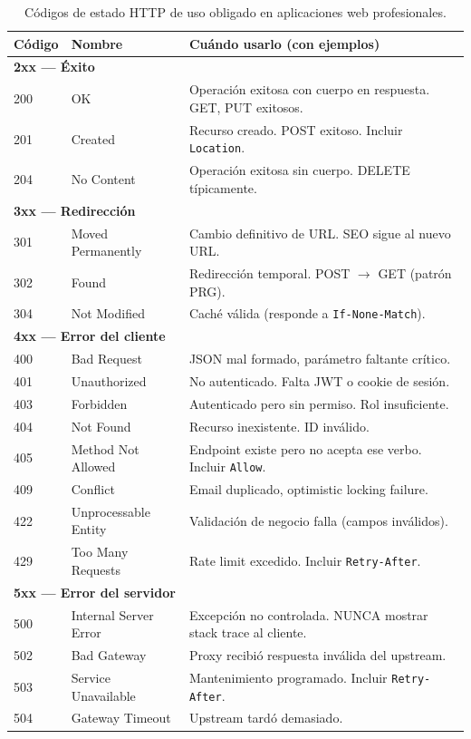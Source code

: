 \documentclass[11pt,a4paper,openany]{book}
\begin{document}
\begin{table}[htbp]
\centering
\caption{Códigos de estado HTTP de uso obligado en aplicaciones web profesionales.}
\footnotesize
\begin{tabularx}{\textwidth}{llX}
\toprule
\textbf{Código} & \textbf{Nombre} & \textbf{Cuándo usarlo (con ejemplos)}\\
\midrule
\multicolumn{3}{l}{\textbf{2xx --- Éxito}}\\
200 & OK                  & Operación exitosa con cuerpo en respuesta. GET, PUT exitosos.\\
201 & Created             & Recurso creado. POST exitoso. Incluir \texttt{Location}.\\
204 & No Content          & Operación exitosa sin cuerpo. DELETE típicamente.\\
\midrule
\multicolumn{3}{l}{\textbf{3xx --- Redirección}}\\
301 & Moved Permanently   & Cambio definitivo de URL. SEO sigue al nuevo URL.\\
302 & Found               & Redirección temporal. POST $\to$ GET (patrón PRG).\\
304 & Not Modified        & Caché válida (responde a \texttt{If-None-Match}).\\
\midrule
\multicolumn{3}{l}{\textbf{4xx --- Error del cliente}}\\
400 & Bad Request         & JSON mal formado, parámetro faltante crítico.\\
401 & Unauthorized        & No autenticado. Falta JWT o cookie de sesión.\\
403 & Forbidden           & Autenticado pero sin permiso. Rol insuficiente.\\
404 & Not Found           & Recurso inexistente. ID inválido.\\
405 & Method Not Allowed  & Endpoint existe pero no acepta ese verbo. Incluir \texttt{Allow}.\\
409 & Conflict            & Email duplicado, optimistic locking failure.\\
422 & Unprocessable Entity & Validación de negocio falla (campos inválidos).\\
429 & Too Many Requests   & Rate limit excedido. Incluir \texttt{Retry-After}.\\
\midrule
\multicolumn{3}{l}{\textbf{5xx --- Error del servidor}}\\
500 & Internal Server Error & Excepción no controlada. NUNCA mostrar stack trace al cliente.\\
502 & Bad Gateway         & Proxy recibió respuesta inválida del upstream.\\
503 & Service Unavailable & Mantenimiento programado. Incluir \texttt{Retry-After}.\\
504 & Gateway Timeout     & Upstream tardó demasiado.\\
\bottomrule
\end{tabularx}
\end{table}
\end{document}
